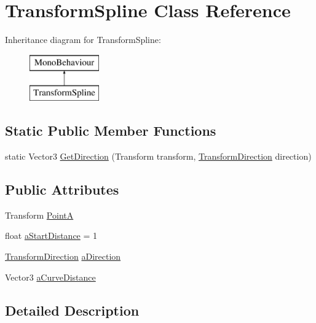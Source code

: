 \hypertarget{class_transform_spline}{}\section{Transform\+Spline Class Reference}
\label{class_transform_spline}
Inheritance diagram for Transform\+Spline\+:\begin{figure}[H]
\begin{center}
\leavevmode
\includegraphics[height=2.000000cm]{class_transform_spline}
\end{center}
\end{figure}
\subsection*{Static Public Member Functions}
\begin{DoxyCompactItemize}
\item 
static Vector3 \mbox{\hyperlink{class_transform_spline_ae694bc324fd3af1d8148ee8c31ddbcc4}{Get\+Direction}} (Transform transform, \mbox{\hyperlink{_transform_spline_8cs_aa83ec4569fa5f851dd6585ebb349123b}{Transform\+Direction}} direction)
\end{DoxyCompactItemize}
\subsection*{Public Attributes}
\begin{DoxyCompactItemize}
\item 
Transform \mbox{\hyperlink{class_transform_spline_aea9fd0137cf816b7c150237d6e6bbdeb}{PointA}}
\item 
float \mbox{\hyperlink{class_transform_spline_a197f93228b36c491a04b5b701fb59660}{a\+Start\+Distance}} = 1
\item 
\mbox{\hyperlink{_transform_spline_8cs_aa83ec4569fa5f851dd6585ebb349123b}{Transform\+Direction}} \mbox{\hyperlink{class_transform_spline_ae4001134ec77ad5ae0e52a95a46fc21a}{a\+Direction}}
\item 
Vector3 \mbox{\hyperlink{class_transform_spline_a95be01256f09ffbe5c67fc11aa936534}{a\+Curve\+Distance}}
\end{DoxyCompactItemize}


\subsection{Detailed Description}



